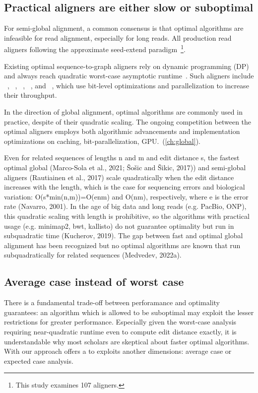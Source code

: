 \subsection*{Practical aligners are either slow or suboptimal}

For semi-global alignment, a common consensus is that optimal algorithms are
infeasible for read alignment, especially for long reads. All production read
aligners following the approximate seed-extend
paradigm~\cite{alser2021technology}\footnote{This study examines 107 aligners.}.

Existing optimal sequence-to-graph aligners rely on dynamic programming (DP) and
always reach quadratic worst-case asymptotic runtime~\citep{equi2019complexity}.
Such aligners include \vargas~\citep{darby2020vargas},
\pasgal~\citep{jain_accelerating_2019},
\graphaligner~\citep{rautiainen_bitparallel_2019},
\hga~\citep{feng2021accelerating}, and \vg~\citep{garrison_variation_2018},
which use bit-level optimizations and parallelization to increase their
throughput.

In the direction of global alignment, optimal algorithms are commonly used in
practice, despite of their quadratic scaling. The ongoing competition between
the optimal aligners employs both algorithmic advancements and implementation
optimizations on caching, bit-parallelization, GPU.~(\cref{ch:global}).

Even for related sequences of lengths n and m and edit distance s, the fastest
optimal global (Marco-Sola et al., 2021; Šošic and Šikic, 2017)) and semi-global
aligners (Rautiainen et al., 2017) scale quadratically when the edit distance
increases with the length, which is the case for sequencing errors and
biological variation: O(s*min(n,m))=O(enm) and O(nm), respectively, where e is
the error rate (Navarro, 2001). In the age of big data and long reads (e.g.
PacBio, ONP), this quadratic scaling with length is prohibitive, so the
algorithms with practical usage (e.g. minimap2, bwt, kallisto) do not guarantee
optimality but run in subquadratic time (Kucherov, 2019). The gap between fast
and optimal global alignment has been recognized but no optimal algorithms are
known that run subquadratically for related sequences (Medvedev, 2022a).

\subsection*{Average case instead of worst case}

There is a fundamental trade-off between perforamance and optimality guarantees:
an algorithm which is allowed to be suboptimal may exploit the lesser
restrictions for greater performance. Especially given the worst-case analysis
requiring near-quadratic runtime even to compute edit distance exactly, it is
understandable why most scholars are skeptical about faster optimal algorithms.
With our \A approach offers a to exploits another dimensions: average case or
expected case analysis.

